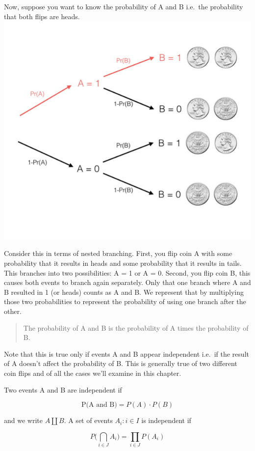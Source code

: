 \documentclass[]{article}
\begin{document}
Now, suppose you want to know the probability of A and B i.e.~the
probability that both flips are heads.
\includegraphics{image-lib/probability_of_A_and_B.png}

Consider this in terms of nested branching. First, you flip coin A with
some probability that it results in heads and some probability that it
results in tails. This branches into two possibilities: A = 1 or A = 0.
Second, you flip coin B, this causes both events to branch again
separately. Only that one branch where A and B resulted in 1 (or heads)
counts as A and B. We represent that by multiplying those two
probabilities to represent the probability of using one branch after the
other.

\begin{quote}
The probability of A and B is the probability of A times the probability
of B.
\end{quote}

Note that this is true only if events A and B appear independent i.e.~if
the result of A doesn't affect the probability of B. This is generally
true of two different coin flips and of all the cases we'll examine in
this chapter.

Two events A and B are independent if

\[\textrm{P(A and B)} = P(A) \cdot P(B)\]

and we write \(A \amalg B\). A set of events \(A_i : i \in I\) is
independent if

\[P\Bigg(\displaystyle\bigcap_{i \in J}A_i\Bigg) = \prod_{i \in J}P(A_i)\]
\end{document}
